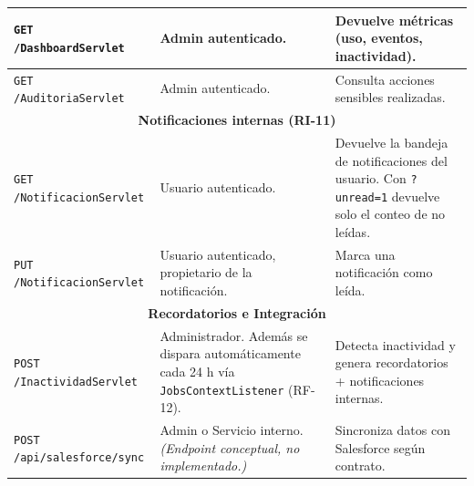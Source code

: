 \documentclass{report}
\begin{document}
\begin{longtable}{|p{}|p{}|p{}|}
\texttt{GET /DashboardServlet} & Admin autenticado. & Devuelve métricas (uso, eventos, inactividad). \\ \hline
\texttt{GET /AuditoriaServlet} & Admin autenticado. & Consulta acciones sensibles realizadas. \\ \hline
\multicolumn{3}{|c|}{\textbf{Notificaciones internas (RI-11)}} \\ \hline
\texttt{GET /NotificacionServlet} & Usuario autenticado. & Devuelve la bandeja de notificaciones del usuario. Con \texttt{?unread=1} devuelve solo el conteo de no leídas. \\ \hline
\texttt{PUT /NotificacionServlet} & Usuario autenticado, propietario de la notificación. & Marca una notificación como leída. \\ \hline
\multicolumn{3}{|c|}{\textbf{Recordatorios e Integración}} \\ \hline
\texttt{POST /InactividadServlet} & Administrador. Además se dispara automáticamente cada 24 h vía \texttt{JobsContextListener} (RF-12). & Detecta inactividad y genera recordatorios + notificaciones internas. \\ \hline
\texttt{POST /api/salesforce/sync} & Admin o Servicio interno. \textit{(Endpoint conceptual, no implementado.)} & Sincroniza datos con Salesforce según contrato. \\ \hline
\end{longtable}
\end{document}
